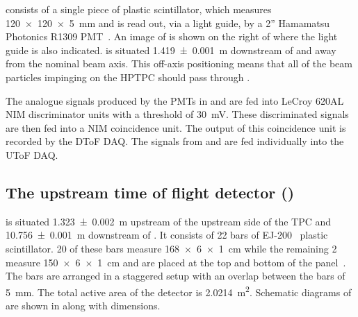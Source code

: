 \STwo consists of a single piece of plastic scintillator, which measures \SI{120 x 120 x 5}{\milli\metre} and is read out, via a light guide, by a 2'' Hamamatsu Photonics R1309 PMT~\cite{hamamatsu}.
An image of \STwo is shown on the right of  where the light guide is also indicated.
\STwo is situated \SI{1.419(1)}{\metre} downstream of \SOne and away from the nominal beam axis.
This off-axis positioning means that all of the beam particles impinging on the HPTPC should pass through \STwo.

The analogue signals produced by the PMTs in \SOne and \STwo are fed into LeCroy 620AL NIM discriminator units with a threshold of \SI{30}{\milli\volt}.
These discriminated signals are then fed into a NIM coincidence unit.
The output of this coincidence unit is recorded by the DToF DAQ.
The signals from \SOne and \STwo are fed individually into the UToF DAQ.

\subsection{The upstream time of flight detector (\SThree)}
\label{sec:hptpc_beam_flux:overview:s3}

\SThree is situated \SI{1.323(2)}{\metre} upstream of the upstream side of the TPC and \SI{10.756(1)}{\metre} downstream of \SOne.
It consists of 22 bars of EJ-200~\cite{ej200} plastic scintillator.
20 of these bars measure \SI{168 x 6 x 1}{\centi\metre} while the remaining 2 measure \SI{150 x 6 x 1}{\centi\metre} and are placed at the top and bottom of the panel~\cite{s3Paper}.
The bars are arranged in a staggered setup with an overlap between the bars of \SI{5}{\milli\metre}.
The total active area of the detector is \SI{2.0214}{\metre\squared}.
Schematic diagrams of \SThree are shown in  along with dimensions.

